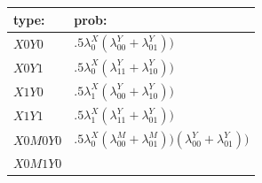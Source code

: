 \documentclass[12pt,]{book}
\begin{document}
\begin{longtable}[]{@{}ll@{}}
\toprule
\begin{minipage}[b]{0.11\columnwidth}\raggedright
type:\strut
\end{minipage} & \begin{minipage}[b]{0.84\columnwidth}\raggedright
prob:\strut
\end{minipage}\tabularnewline
\midrule
\endhead
\begin{minipage}[t]{0.11\columnwidth}\raggedright
\(X0Y0\)\strut
\end{minipage} & \begin{minipage}[t]{0.84\columnwidth}\raggedright
\(.5\lambda^X_0(\lambda^Y_{00}+\lambda^Y_{01}))\)\strut
\end{minipage}\tabularnewline
\begin{minipage}[t]{0.11\columnwidth}\raggedright
\(X0Y1\)\strut
\end{minipage} & \begin{minipage}[t]{0.84\columnwidth}\raggedright
\(.5\lambda^X_0(\lambda^Y_{11}+\lambda^Y_{10}))\)\strut
\end{minipage}\tabularnewline
\begin{minipage}[t]{0.11\columnwidth}\raggedright
\(X1Y0\)\strut
\end{minipage} & \begin{minipage}[t]{0.84\columnwidth}\raggedright
\(.5\lambda^X_1(\lambda^Y_{00}+\lambda^Y_{10}))\)\strut
\end{minipage}\tabularnewline
\begin{minipage}[t]{0.11\columnwidth}\raggedright
\(X1Y1\)\strut
\end{minipage} & \begin{minipage}[t]{0.84\columnwidth}\raggedright
\(.5\lambda^X_1(\lambda^Y_{11}+\lambda^Y_{01}))\)\strut
\end{minipage}\tabularnewline
\begin{minipage}[t]{0.11\columnwidth}\raggedright
\(X0M0Y0\)\strut
\end{minipage} & \begin{minipage}[t]{0.84\columnwidth}\raggedright
\(.5\lambda^X_0(\lambda^M_{00}+\lambda^M_{01}))(\lambda^Y_{00}+\lambda^Y_{01}))\)\strut
\end{minipage}\tabularnewline
\begin{minipage}[t]{0.11\columnwidth}\raggedright
\(X0M1Y0\)\strut
\end{minipage} & \begin{minipage}[t]{0.84\columnwidth}\raggedright

\end{minipage}
\end{longtable}
\end{document}

